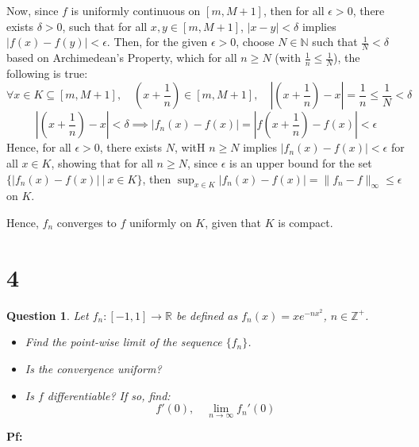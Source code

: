 \documentclass{article}
\newtheorem{question}{Question}
\begin{document}
\begin{itemize}
    Now, since $f$ is uniformly continuous on $[m,M+1]$, then for all $\epsilon>0$, there exists $\delta>0$, such that for all $x,y\in[m,M+1]$, $|x-y|<\delta$ implies $|f(x)-f(y)|<\epsilon$.
    Then, for the given $\epsilon>0$, choose $N\in\mathbb{N}$ such that $\frac{1}{N}<\delta$ based on Archimedean's Property, which for all $n\geq N$ (with $\frac{1}{n}\leq \frac{1}{N}$), the following is true:
    $$\forall x\in K\subseteq [m,M+1],\quad \left(x+\frac{1}{n}\right)\in [m,M+1],\quad \left|\left(x+\frac{1}{n}\right)-x\right| = \frac{1}{n}\leq \frac{1}{N}<\delta$$
    $$\left|\left(x+\frac{1}{n}\right)-x\right| <\delta \implies |f_n(x)-f(x)| = \left|f\left(x+\frac{1}{n}\right)-f(x)\right| < \epsilon$$
    Hence, for all $\epsilon>0$, there exists $N$, witH $n\geq N$ implies $|f_n(x)-f(x)|<\epsilon$ for all $x\in K$,
    showing that for all $n\geq N$, since $\epsilon$ is an upper bound for the set $\{|f_n(x)-f(x)|\ |\ x\in K\}$, then $\sup_{x\in K}|f_n(x)-f(x)| = \|f_n-f\|_{\infty} \leq \epsilon$ on $K$.

    Hence, $f_n$ converges to $f$ uniformly on $K$, given that $K$ is compact.
\end{itemize}

\break

\section*{4}
\begin{myBox}[]{}
    \begin{question}
        Let $f_n:[-1,1]\rightarrow\mathbb{R}$ be defined as $f_n(x)=xe^{-nx^2}$, $n\in\mathbb{Z}^+$.
        \begin{itemize}
            \item[(a)] Find the point-wise limit of the sequence $\{f_n\}$.
            \item[(b)] Is the convergence uniform?
            \item[(c)] Is $f$ differentiable? If so, find:
            $$f'(0),\quad \lim_{n\rightarrow \infty}f_n'(0)$$
        \end{itemize}
    \end{question}
\end{myBox}

\textbf{Pf:}
\end{document}
